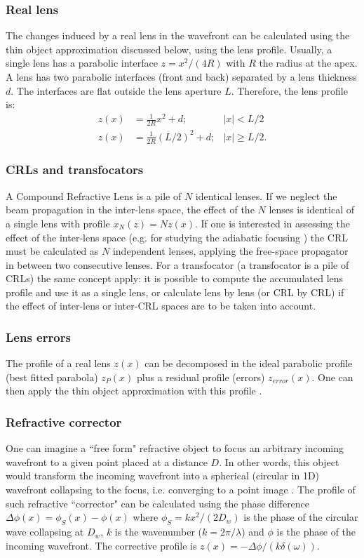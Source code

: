 \documentclass{iucr}              %
\begin{document}
\subsubsection{Real lens} The changes induced by a real lens in the wavefront can be calculated using the thin object approximation discussed below, using the lens profile. Usually, a single lens has a parabolic interface $z=x^2/(4R)$ with $R$ the radius at the apex. A lens has two parabolic interfaces (front and back) separated by a lens thickness $d$. The interfaces are flat outside the lens aperture $L$. Therefore, the lens profile is:
\begin{align}
    z(x) &= \frac{1}{2R} x^2 + d; & |x| < L/2\\ \nonumber
    z(x) &= \frac{1}{2R} (L/2)^2 + d; & |x| \ge L/2.
\end{align}

\subsubsection{CRLs and transfocators}
A Compound Refractive Lens is a pile of $N$ identical lenses. If we neglect the beam propagation in the inter-lens space, the effect of the $N$ lenses is identical of a single lens with profile $x_N(z)=N z(x)$. If one is interested in assessing the effect of the inter-lens space (e.g. for studying the adiabatic focusing \cite{Schroer_adiabatic}) the CRL must be calculated as $N$ independent lenses, applying the free-space propagator in between two consecutive lenses. For a transfocator (a transfocator is a pile of CRLs) the same concept apply: it is possible to compute the accumulated lens profile and use it as a single lens, or calculate lens by lens (or CRL by CRL) if the effect of inter-lens or inter-CRL spaces are to be taken into account.

\subsubsection{Lens errors}
The profile of a real lens $z(x)$ can be decomposed in the ideal parabolic profile (best fitted parabola) $z_P(x)$ plus a residual profile (errors) $z_{error}(x)$. One can then apply the thin object approximation with this profile \cite{Celestre:mo5214}. 

\subsubsection{Refractive corrector}
\label{sec:refractorCorrector}
One can imagine a ``free form" refractive object to focus an arbitrary incoming wavefront to a given point placed at a distance $D$. In other words, this object would transform the incoming wavefront into a spherical (circular in 1D) wavefront collapsing to the focus, i.e. converging to a point image \cite{ChubarElleaumeSnigirev2001}. The profile of such refractive ``corrector"  can be calculated using the phase difference $\Delta\phi(x)=\phi_S(x)-\phi(x)$ where $\phi_S=k x^2 / (2 D_w)$ is the phase of the circular wave collapsing at $D_w$, $k$ is the wavenumber ($k=2\pi/\lambda$) and $\phi$ is the phase of the incoming wavefront. The corrective profile is $z(x)=-\Delta\phi/(k \delta(\omega))$.
\end{document}
